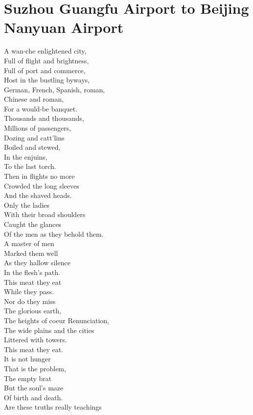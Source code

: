 \documentclass[smalldemyvopaper,11pt,twoside,onecolumn,openright,extrafontsizes]{memoir}
\begin{document}
\chapter{Suzhou Guangfu Airport to Beijing Nanyuan Airport}
A wan-che enlightened city,
\\Full of flight and brightness,
\\Full of port and commerce,
\\Host in the bustling byways,
\\German, French, Spanish, roman,
\\Chinese and roman,
\\For a would-be banquet.
\\Thousands and thousands,
\\Millions of passengers,
\\Dozing and catt'lins
\\Boiled and stewed,
\\In the enjuins,
\\To the last torch.
\\Then in flights no more
\\Crowded the long sleeves
\\And the shaved heads.
\\Only the ladies
\\With their broad shoulders
\\Caught the glances
\\Of the men as they behold them.
\\A master of men
\\Marked them well
\\As they hallow silence
\\In the flesh's path.
\\This meat they eat
\\While they pass.
\\Nor do they miss
\\The glorious earth,
\\The heights of coeur Renunciation,
\\The wide plains and the cities
\\Littered with towers.
\\This meat they eat.
\\It is not hunger
\\That is the problem,
\\The empty brat
\\But the soul's maze
\\Of birth and death.
\\Are these truths really teachings
\end{document}
